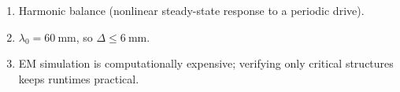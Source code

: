 \begin{enumerate}[leftmargin=1.6em,itemsep=2pt]
\item Harmonic balance (nonlinear steady-state response to a periodic drive).
\item $\lambda_0 = 60\ \text{mm}$, so $\Delta \le 6\ \text{mm}$.
\item EM simulation is computationally expensive; verifying only critical structures keeps runtimes practical.
\end{enumerate}
